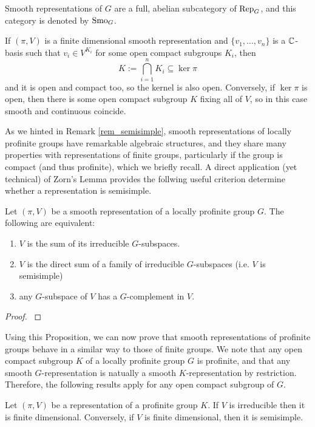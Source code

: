 Smooth representations of $G$ are a full, abelian subcategory of $\mathrm{Rep}_G$, and this category is denoted by $\mathrm{Smo}_G$. 

\begin{rem}
    If $(\pi,V)$ is a finite dimensional smooth representation and $\{v_1,\ldots,v_n\}$ is a $\mathbb{C}$-basis such that $v_i\in V^{K_i}$ for some open compact subgroups $K_i$, then 
    $$K:=\bigcap_{i=1}^n K_i\subseteq\ker\pi$$
    and it is open and compact too, so the kernel is also open. 
    Conversely, if $\ker\pi$ is open, then there is some open compact subgroup $K$ fixing all of $V$, so in this case smooth and continuous coincide. 
\end{rem}


As we hinted in Remark \ref{rem_semisimple}, smooth representations of locally profinite groups have remarkable algebraic structures, and they share many properties with representations of finite groups, particularly if the group is compact (and thus profinite), which we briefly recall. A direct application (yet technical) of Zorn's Lemma provides the follwing useful criterion determine whether a representation is semisimple. 

\begin{prop}\label{prop_semisimple}
    Let $(\pi,V)$ be a smooth representation of a locally profinite group $G$. The following are equivalent:
    \begin{enumerate}
        \item $V$ is the sum of its irreducible $G$-subspaces.
        \item $V$ is the direct sum of a family of irreducible $G$-subspaces (i.e. $V$ is semisimple)
        \item any $G$-subspace of $V$ has a $G$-complement in $V$.
    \end{enumerate}
\end{prop}

\begin{proof}
    \cite[2.2 Lemma]{BH1}
\end{proof}

Using this Proposition, we can now prove that smooth representations of profinite groups behave in a similar way to those of finite groups. We note that any open compact subgroup $K$ of a locally profinite group $G$ is profinite, and that any smooth $G$-representation is natually a smooth $K$-representation by restriction. Therefore, the following results apply for any open compact subgroup of $G$.

\begin{prop}\label{lem_profinite_smooth}
    Let $(\pi,V)$ be a representation of a profinite group $K$. If $V$ is irreducible then it is finite dimensional. Conversely, if $V$ is finite dimensional, then it is semisimple.
\end{prop}

